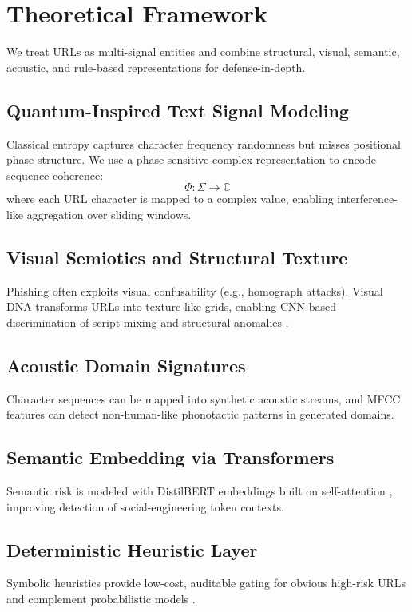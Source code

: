 \documentclass[conference]{IEEEtran}
\begin{document}
\section{Theoretical Framework}
We treat URLs as multi-signal entities and combine structural, visual, semantic, acoustic, and rule-based representations for defense-in-depth.

\subsection{Quantum-Inspired Text Signal Modeling}
Classical entropy captures character frequency randomness but misses positional phase structure. We use a phase-sensitive complex representation to encode sequence coherence:
\begin{equation}
\Phi : \Sigma \rightarrow \mathbb{C}
\end{equation}
where each URL character is mapped to a complex value, enabling interference-like aggregation over sliding windows.

\subsection{Visual Semiotics and Structural Texture}
Phishing often exploits visual confusability (e.g., homograph attacks). Visual DNA transforms URLs into texture-like grids, enabling CNN-based discrimination of script-mixing and structural anomalies \cite{b22,b23,b24,b27}.

\subsection{Acoustic Domain Signatures}
Character sequences can be mapped into synthetic acoustic streams, and MFCC features can detect non-human-like phonotactic patterns in generated domains.

\subsection{Semantic Embedding via Transformers}
Semantic risk is modeled with DistilBERT embeddings \cite{b14} built on self-attention \cite{b1}, improving detection of social-engineering token contexts.

\subsection{Deterministic Heuristic Layer}
Symbolic heuristics provide low-cost, auditable gating for obvious high-risk URLs and complement probabilistic models \cite{b11,b12,b18}.
\end{document}
